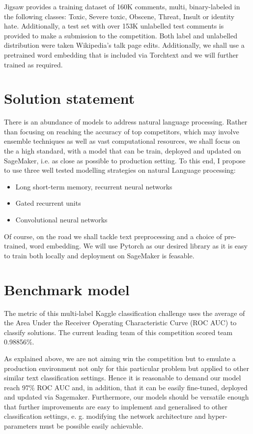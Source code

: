 \documentclass[book,preprintnumbers,11pt]{article}
\begin{document}
 Jigsaw provides a training dataset  of 160K comments, multi, binary-labeled in the following classes:
 Toxic, Severe toxic, Obscene, Threat, Insult or  identity hate.
 Additionally, a test set  with over 153K unlabelled  test comments is provided to make 
 a submission to the competition.
 Both label and unlabelled distribution were taken Wikipedia's talk page edits. Additionally, 
 we shall use a pretrained word embedding that is included via Torchtext and we will further 
 trained as required. 
 

\section{Solution statement}

There is an abundance of models to address natural language processing. Rather than focusing 
on reaching the accuracy of top competitors, which may involve ensemble 
techniques as well as vast computational  resources, we shall focus on the a high standard, 
with a model that can be train, deployed and updated on SageMaker, i.e. 
as close as possible to production setting. To this end, 
I propose to use three well tested modelling strategies on natural Language processing:

\begin{itemize}
\item Long short-term memory, recurrent neural networks
\item Gated recurrent units
\item Convolutional neural networks
\end{itemize}
 
Of course, on the road we shall tackle text preprocessing and a choice of
pre-trained,  word embedding. We will use Pytorch as our desired library as 
it is easy to train both locally and deployment on SageMaker is feasable. 
 
\section{Benchmark model}

The metric of this multi-label Kaggle classification challenge 
uses the average of the  Area Under the Receiver Operating Characteristic Curve (ROC AUC) to 
 classify solutions.   The current leading team of this competition scored team 0.98856\%.

As explained above, we are not aiming win the competition but to emulate a production 
environment not only for this particular problem but applied to other similar text
classification settings. Hence it is reasonable to demand our model reach 97\% ROC AUC
and, in addition, that it can be easily fine-tuned, deployed and updated via Sagemaker. Furthermore, our 
models should be versatile enough that further improvements are easy to implement and 
generalised to other classification settings, e. g. modifying the network architecture and hyper-parameters must be possible easily achievable. 
\end{document}
